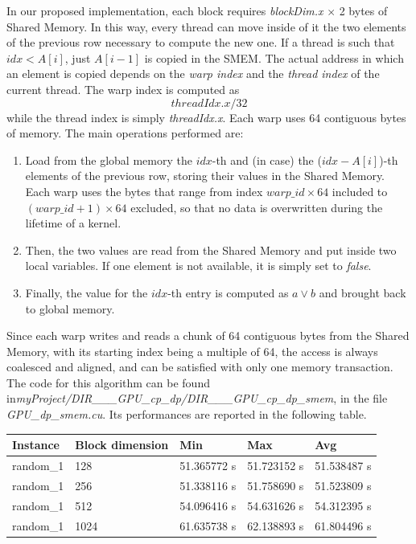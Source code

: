 \documentclass[12pt]{extarticle}
\begin{document}
In our proposed implementation, each block requires \emph{blockDim.x} $\times$ 2 bytes of Shared Memory. In this way, every thread can move inside of it the two elements of the previous row necessary to compute the new one. If a thread is such that $idx < A[i]$, just $A[i-1]$ is copied in the SMEM. The actual address in which an element is copied depends on the \emph{warp index} and the \emph{thread index} of the current thread. The warp index is computed as
\[threadIdx.x / 32\]
while the thread index is simply \emph{threadIdx.x}.\newline
Each warp uses 64 contiguous bytes of memory. The main operations performed are:
\begin{enumerate}
    \item Load from the global memory the $idx$-th and (in case) the ($idx - A[i]$)-th elements of the previous row, storing their values in the Shared Memory. Each warp uses the bytes that range from index $warp\_id \times 64$ included to $(warp\_id + 1) \times 64$ excluded, so that no data is overwritten during the lifetime of a kernel.
    \item Then, the two values are read from the Shared Memory and put inside two local variables. If one element is not available, it is simply set to \emph{false}.
    \item Finally, the value for the $idx$-th entry is computed as $a \lor b$ and brought back to global memory.
\end{enumerate}
Since each warp writes and reads a chunk of 64 contiguous bytes from the Shared Memory, with its starting index being a multiple of 64, the access is always coalesced and aligned, and can be satisfied with only one memory transaction.\newline
The code for this algorithm can be found in\newline \emph{myProject/DIR\_\_\_GPU\_cp\_dp/DIR\_\_\_GPU\_cp\_dp\_smem}, in the file \emph{GPU\_dp\_smem.cu}.\newline
Its performances are reported in the following table.
\begin{center}
\begin{tabular}{ | m{2.2cm} | m{3.2cm} | m{2.2cm} | m{2.2cm} | m{2.2cm} |}
 \hline
 Instance & Block dimension & Min & Max & Avg\\
 \hline
 random\_1 & 128 & 51.365772 s & 51.723152 s & 51.538487 s\\
 \hline
 random\_1 & 256 & 51.338116 s & 51.758690 s & 51.523809 s\\
 \hline
 random\_1 & 512 & 54.096416 s & 54.631626 s & 54.312395 s\\
 \hline
 random\_1 & 1024 & 61.635738 s & 62.138893 s & 61.804496 s\\
 \hline
 \end{tabular}
 \end{center}
\end{document}
